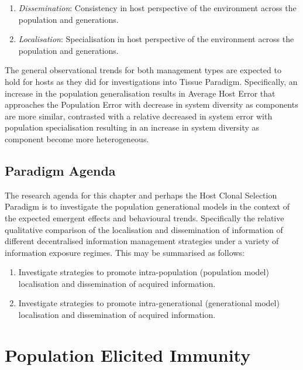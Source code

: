 \begin{enumerate}
	\item \emph{Dissemination}: Consistency in host perspective of the environment across the population and generations.
	\item \emph{Localisation}: Specialisation in host perspective of the environment across the population and generations.
\end{enumerate}

The general observational trends for both management types are expected to hold for hosts as they did for investigations into Tissue Paradigm. Specifically, an increase in the population generalisation results in Average Host Error that approaches the Population Error with decrease in system diversity as components are more similar, contrasted with a relative decreased in system error with population specialisation resulting in an increase in system diversity as component become more heterogeneous. 

%
%
\subsection{Paradigm Agenda}
\label{subsec:hosts:paradigm:realised:agenda}
The research agenda for this chapter and perhaps the Host Clonal Selection Paradigm is to investigate the population generational models in the context of the expected emergent effects and behavioural trends. Specifically the relative qualitative comparison of the localisation and dissemination of information of different decentralised information management strategies under a variety of information exposure regimes. This may be summarised as follows:

\begin{enumerate}
	\item Investigate strategies to promote intra-population (population model) localisation and dissemination of acquired information.
	\item Investigate strategies to promote intra-generational (generational model) localisation and dissemination of acquired information.
\end{enumerate}


%
%
\section{Population Elicited Immunity}
\label{sec:hosts:population:elicited}

